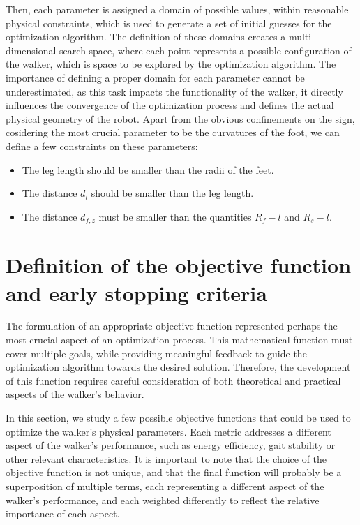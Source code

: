 Then, each parameter is assigned a domain of possible values, within reasonable physical constraints, which is used to generate a set of initial guesses for the optimization algorithm. 
The definition of these domains creates a multi-dimensional search space, where each point represents a possible configuration of the walker, which is space to be explored by the optimization algorithm.
The importance of defining a proper domain for each parameter cannot be underestimated, as this task impacts the functionality of the walker, it directly influences the convergence of the optimization process and defines the actual physical geometry of the robot.
Apart from the obvious confinements on the sign, cosidering the most crucial parameter to be the curvatures of the foot, we can define a few constraints on these parameters:

\begin{itemize}
    \item The leg length should be smaller than the radii of the feet.
    \item The distance $d_l$ should be smaller than the leg length.
    \item The distance $d_{f,z}$ must be smaller than the quantities $R_f - l$ and $R_s - l$.
\end{itemize}

\section{Definition of the objective function and early stopping criteria}
The formulation of an appropriate objective function represented perhaps the most crucial aspect of an optimization process. 
This mathematical function must cover multiple goals, while providing meaningful feedback to guide the optimization algorithm towards the desired solution.
Therefore, the development of this function requires careful consideration of both theoretical and practical aspects of the walker's behavior.

In this section, we study a few possible objective functions that could be used to optimize the walker's physical parameters.
Each metric addresses a different aspect of the walker's performance, such as energy efficiency, gait stability or other relevant characteristics.
It is important to note that the choice of the objective function is not unique, and that the final function will probably be a superposition of multiple terms, each representing a different aspect of the walker's performance, and each weighted differently to reflect the relative importance of each aspect.

